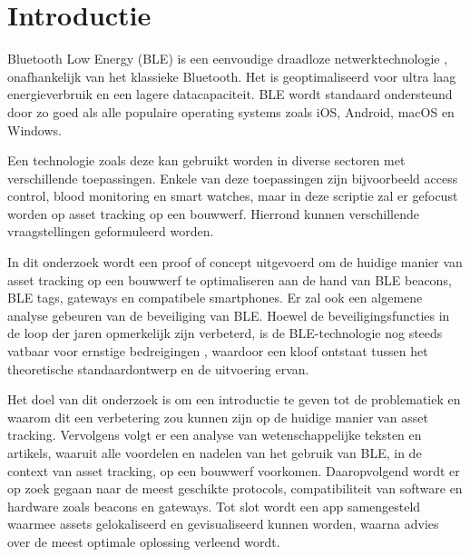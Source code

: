 
\section{Introductie}%
\label{sec:introductie}



Bluetooth Low Energy (BLE) is een eenvoudige draadloze netwerktechnologie \autocite{Heydon2013}, onafhankelijk van het klassieke Bluetooth. Het is geoptimaliseerd voor ultra laag energieverbruik en een lagere datacapaciteit. BLE wordt standaard ondersteund door zo goed als alle populaire operating systems zoals iOS, Android, macOS en Windows.

Een technologie zoals deze kan gebruikt worden in diverse sectoren met verschillende toepassingen. Enkele van deze toepassingen zijn bijvoorbeeld access control, blood monitoring en smart watches, maar in deze scriptie zal er gefocust worden op asset tracking op een bouwwerf. Hierrond kunnen verschillende vraagstellingen geformuleerd worden.

In dit onderzoek wordt een proof of concept uitgevoerd om de huidige manier van asset tracking op een bouwwerf te optimaliseren aan de hand van BLE beacons, BLE tags, gateways en compatibele smartphones.
Er zal ook een algemene analyse gebeuren van de beveiliging van BLE. Hoewel de beveiligingsfuncties in de loop der jaren opmerkelijk zijn verbeterd, is de BLE-technologie nog steeds vatbaar voor ernstige bedreigingen \autocite{Lacava_2022}, waardoor een kloof ontstaat tussen het theoretische standaardontwerp en de uitvoering ervan.

Het doel van dit onderzoek is om een introductie te geven tot de problematiek en waarom dit een verbetering zou kunnen zijn op de huidige manier van asset tracking. Vervolgens volgt er een analyse van wetenschappelijke teksten en artikels, waaruit alle voordelen en nadelen van het gebruik van BLE, in de context van asset tracking, op een bouwwerf voorkomen. Daaropvolgend wordt er op zoek gegaan naar de meest geschikte protocols, compatibiliteit van software en hardware zoals beacons en gateways. Tot slot wordt een app samengesteld waarmee assets gelokaliseerd en gevisualiseerd kunnen worden, waarna advies over de meest optimale oplossing verleend wordt.



